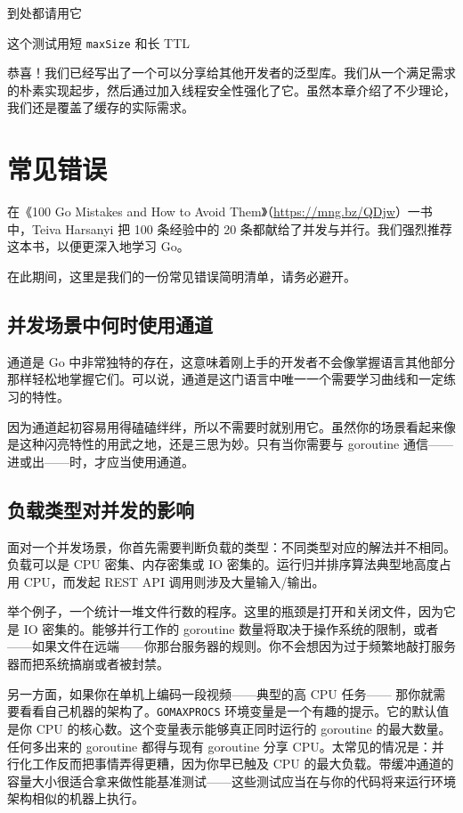 \begin{codeannotations}
\item 到处都请用它
\item 这个测试用短 \texttt{maxSize} 和长 TTL
\end{codeannotations}

恭喜！我们已经写出了一个可以分享给其他开发者的泛型库。我们从一个满足需求的朴素实现起步，然后通过加入线程安全性强化了它。虽然本章介绍了不少理论，我们还是覆盖了缓存的实际需求。

\section{常见错误}

在《100 Go Mistakes and How to Avoid Them》（\url{https://mng.bz/QDjw}）一书中，Teiva Harsanyi 把 100 条经验中的 20 条都献给了并发与并行。我们强烈推荐这本书，以便更深入地学习 Go。

在此期间，这里是我们的一份常见错误简明清单，请务必避开。

\subsection{并发场景中何时使用通道}

通道是 Go 中非常独特的存在，这意味着刚上手的开发者不会像掌握语言其他部分那样轻松地掌握它们。可以说，通道是这门语言中唯一一个需要学习曲线和一定练习的特性。

因为通道起初容易用得磕磕绊绊，所以不需要时就别用它。虽然你的场景看起来像是这种闪亮特性的用武之地，还是三思为妙。只有当你需要与 goroutine 通信——进或出——时，才应当使用通道。

\subsection{负载类型对并发的影响}

面对一个并发场景，你首先需要判断负载的类型：不同类型对应的解法并不相同。负载可以是 CPU 密集、内存密集或 IO 密集的。运行归并排序算法典型地高度占用 CPU，而发起 REST API 调用则涉及大量输入/输出。

举个例子，一个统计一堆文件行数的程序。这里的瓶颈是打开和关闭文件，因为它是 IO 密集的。能够并行工作的 goroutine 数量将取决于操作系统的限制，或者——如果文件在远端——你那台服务器的规则。你不会想因为过于频繁地敲打服务器而把系统搞崩或者被封禁。

另一方面，如果你在单机上编码一段视频——典型的高 CPU 任务——%
那你就需要看看自己机器的架构了。\texttt{GOMAXPROCS} 环境变量是一个有趣的提示。它的默认值是你 CPU 的核心数。这个变量表示能够真正同时运行的 goroutine 的最大数量。任何多出来的 goroutine 都得与现有 goroutine 分享 CPU。太常见的情况是：并行化工作反而把事情弄得更糟，因为你早已触及 CPU 的最大负载。带缓冲通道的容量大小很适合拿来做性能基准测试——这些测试应当在与你的代码将来运行环境架构相似的机器上执行。

